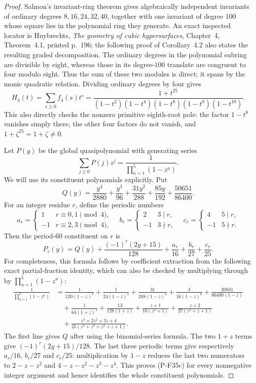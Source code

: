 \documentclass[11pt,a4paper]{article}
\begin{document}
\begin{proof}
Salmon's invariant-ring theorem gives algebraically independent
invariants of ordinary degrees $8,16,24,32,40$, together with
one invariant of degree $100$ whose square lies in the polynomial
ring they generate. An exact inspected locator is Huybrechts,
\emph{The geometry of cubic hypersurfaces}, Chapter~4,
Theorem~4.1, printed p.~196; the following proof of Corollary~4.2
also states the resulting graded decomposition. The ordinary
degrees in the polynomial subring are divisible by eight, whereas
those in its degree-$100$ translate are congruent to four modulo
eight. Thus the sum of these two modules is direct; it spans
by the monic quadratic relation. Dividing ordinary degrees by
four gives
\[
 H_4(t)=\sum_{s\ge0}f_4(s)t^s
       =\frac{1+t^{25}}{(1-t^2)(1-t^4)(1-t^6)(1-t^8)(1-t^{10})}.
 \tag{P-F35b}
\]
This also directly checks the nonzero primitive eighth-root
pole: the factor $1-t^8$ vanishes simply there, the other four
factors do not vanish, and $1+\zeta^{25}=1+\zeta\ne0$.

Let $P(y)$ be the global quasipolynomial with generating series
\[
                  \sum_{j\ge0}P(j)z^j
                       =\frac1{\prod_{a=1}^5(1-z^a)}.
\]
We will use its constituent polynomials explicitly. Put
\[
 Q(y)=\frac{y^4}{2880}+\frac{y^3}{96}
            +\frac{31y^2}{288}+\frac{85y}{192}
            +\frac{50651}{86400}.
\]
For an integer residue $r$, define the periodic numbers
\[
 a_r=\begin{cases}1&r\equiv0,1\pmod4,\\-1&r\equiv2,3\pmod4,\end{cases}
 \quad
 b_r=\begin{cases}2&3\mid r,\\-1&3\nmid r,\end{cases}
 \quad
 c_r=\begin{cases}4&5\mid r,\\-1&5\nmid r.\end{cases}
\]
Then the period-$60$ constituent on $r$ is
\[
 P_r(y)=Q(y)+\frac{(-1)^r(2y+15)}{128}
                   +\frac{a_r}{16}+\frac{b_r}{27}+\frac{c_r}{25}.
 \tag{P-F35c}
\]
For completeness, this formula follows by coefficient extraction
from the following exact partial-fraction identity, which can also
be checked by multiplying through by $\prod_{a=1}^5(1-z^a)$:
\begin{align*}
 \frac1{\prod_{a=1}^5(1-z^a)}
 &=\frac1{120(1-z)^5}+\frac1{24(1-z)^4}
   +\frac{31}{288(1-z)^3}+\frac3{16(1-z)^2}
   +\frac{20831}{86400(1-z)}\\
 &\quad+\frac1{64(1+z)^2}+\frac{13}{128(1+z)}
   +\frac{z+1}{16(z^2+1)}
   +\frac{z+2}{27(z^2+z+1)}\\
 &\quad+\frac{z^3+2z^2+3z+4}
                  {25(z^4+z^3+z^2+z+1)}.
 \tag{P-F35d}
\end{align*}
The first line gives $Q$ after using the binomial-series formula.
The two $1+z$ terms give $(-1)^r(2y+15)/128$.
The last three periodic terms give respectively $a_r/16$,
$b_r/27$ and $c_r/25$: multiplication by $1-z$ reduces
the last two numerators to $2-z-z^2$ and
$4-z-z^2-z^3-z^4$. This proves (P-F35c) for every
nonnegative integer argument and hence identifies the whole
constituent polynomials.


\end{proof}
\end{document}
